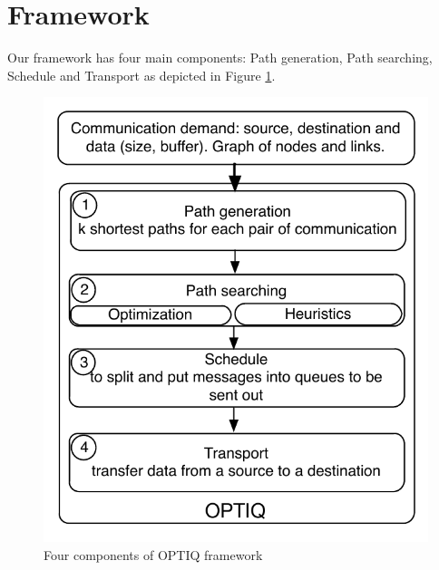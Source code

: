 \section{Framework}
\label{sec:framework}

Our framework has four main components: Path generation, Path searching, Schedule and Transport as depicted in Figure \ref{fig:framework}.

\begin{figure}[!htb]
\vspace{-0.15in}
\centering
\includegraphics[scale=0.55]{figures/framework.pdf}
\vspace{-0.15in}
\caption{Four components of OPTIQ framework}
\vspace{-0.15in}
\label{fig:framework}
\end{figure}

